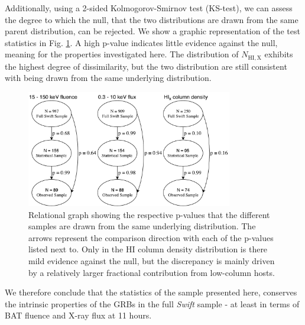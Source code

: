 \documentclass{aa}    %
\begin{document}
Additionally, using a 2-sided Kolmogorov-Smirnov test (KS-test), we can assess
the degree to which the null, that the two distributions are drawn from the same
parent distribution, can be rejected. We show a graphic representation of the
test statistics in Fig. \ref{fig:p_values}. A high p-value indicates little
evidence against the null, meaning for the properties investigated here. The
distribution of $N_{\mathrm{HI,X}}$ exhibits the highest degree of
dissimilarity, but the two distribution are still consistent with being drawn
from the same underlying distribution.

\begin{figure}
	\centerline{\includegraphics[width=9cm]{figures/XSGRB_p_values.pdf}}
\caption{Relational graph showing the respective p-values that the different
	samples are drawn from the same underlying distribution. The arrows represent
	the comparison direction with each of the p-values listed next to. Only in the
	HI column density distribution is there mild evidence against the null, but the
	discrepancy is mainly driven by a relatively larger fractional contribution
	from low-column hosts.} \label{fig:p_values}
\end{figure}

We therefore conclude that the statistics of the sample presented here,
conserves the intrinsic properties of the GRBs in the full \textit{Swift} sample
- at least in terms of BAT fluence and X-ray flux at 11 hours.




\end{document}
